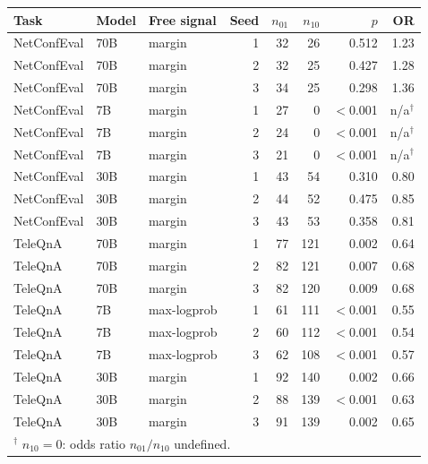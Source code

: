 \begin{tabular}{lllrrrrr}
\toprule
Task & Model & Free signal & Seed & $n_{01}$ & $n_{10}$ & $p$ & OR \\
\midrule
NetConfEval & 70B & margin & 1 & 32 & 26 & 0.512 & 1.23 \\
NetConfEval & 70B & margin & 2 & 32 & 25 & 0.427 & 1.28 \\
NetConfEval & 70B & margin & 3 & 34 & 25 & 0.298 & 1.36 \\
NetConfEval & 7B & margin & 1 & 27 & 0 & $<$0.001 & n/a$^\dagger$ \\
NetConfEval & 7B & margin & 2 & 24 & 0 & $<$0.001 & n/a$^\dagger$ \\
NetConfEval & 7B & margin & 3 & 21 & 0 & $<$0.001 & n/a$^\dagger$ \\
NetConfEval & 30B & margin & 1 & 43 & 54 & 0.310 & 0.80 \\
NetConfEval & 30B & margin & 2 & 44 & 52 & 0.475 & 0.85 \\
NetConfEval & 30B & margin & 3 & 43 & 53 & 0.358 & 0.81 \\
TeleQnA & 70B & margin & 1 & 77 & 121 & 0.002 & 0.64 \\
TeleQnA & 70B & margin & 2 & 82 & 121 & 0.007 & 0.68 \\
TeleQnA & 70B & margin & 3 & 82 & 120 & 0.009 & 0.68 \\
TeleQnA & 7B & max-logprob & 1 & 61 & 111 & $<$0.001 & 0.55 \\
TeleQnA & 7B & max-logprob & 2 & 60 & 112 & $<$0.001 & 0.54 \\
TeleQnA & 7B & max-logprob & 3 & 62 & 108 & $<$0.001 & 0.57 \\
TeleQnA & 30B & margin & 1 & 92 & 140 & 0.002 & 0.66 \\
TeleQnA & 30B & margin & 2 & 88 & 139 & $<$0.001 & 0.63 \\
TeleQnA & 30B & margin & 3 & 91 & 139 & 0.002 & 0.65 \\
\bottomrule
\multicolumn{8}{l}{$^\dagger$ $n_{10}=0$: odds ratio $n_{01}/n_{10}$ undefined.} \\
\end{tabular}
